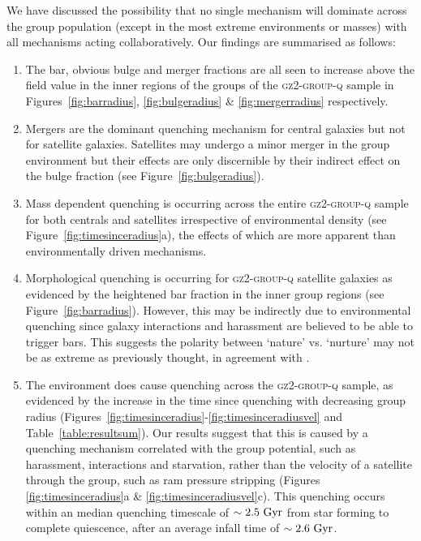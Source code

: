 \documentclass[useAMS,usenatbib]{mn2e}
\def\minor		{\color{minorcol}}
\begin{document}
We have discussed the possibility that no single mechanism will dominate across the group population (except in the most extreme environments or masses) with all mechanisms acting collaboratively. Our findings are summarised as follows:
\begin{enumerate}
\item The bar, obvious bulge and merger fractions are all seen to increase above the field value in the inner regions of the groups of the \textsc{gz2-group-q} sample in Figures~\ref{fig:barradius}, \ref{fig:bulgeradius} \& \ref{fig:mergerradius} respectively.  
 
\item Mergers are the dominant quenching mechanism for central galaxies but not for satellite galaxies. Satellites may undergo a minor merger in the group environment but their effects are only discernible by their indirect effect on the bulge fraction (see Figure~\ref{fig:bulgeradius}).
 
\item Mass dependent quenching is occurring across the entire \textsc{gz2-group-q} sample for both centrals and satellites irrespective of  environmental density (see Figure~\ref{fig:timesinceradius}a), {\minor the effects of which are more apparent than environmentally driven mechanisms}.
 
\item Morphological quenching is occurring for \textsc{gz2-group-q} satellite galaxies as evidenced by the heightened bar fraction in the inner group regions (see Figure~\ref{fig:barradius}). However, this may be indirectly due to environmental quenching since galaxy interactions and harassment are believed to be able to trigger bars. This suggests the polarity between `nature' vs. `nurture' may not be as extreme as previously thought, in agreement with \cite{skibba12}. 

\item The environment does cause quenching across the \textsc{gz2-group-q} sample, as evidenced by the increase in the time since quenching with decreasing group radius (Figures~\ref{fig:timesinceradius}-\ref{fig:timesinceradiusvel} and Table~\ref{table:resultsum}). Our results suggest that this is caused by a quenching mechanism correlated with the group potential, such as harassment, interactions and starvation, rather than the velocity of a satellite through the group, such as ram pressure stripping (Figures \ref{fig:timesinceradius}a \&  \ref{fig:timesinceradiusvel}c). This quenching occurs within an median quenching timescale of $\sim2.5~\rm{Gyr}$ from star forming to complete quiescence, after an average infall time of $\sim 2.6 ~\rm{Gyr}$. 
  
\end{enumerate}
\end{document}
